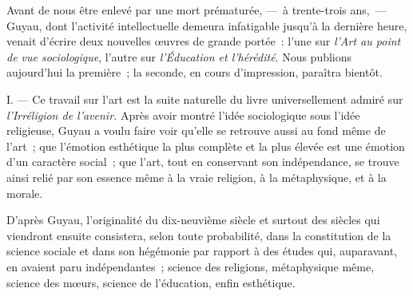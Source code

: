 \documentclass[french,twoside]{book} %
\begin{document}
\noindent Avant de nous être enlevé par une mort prématurée, — à trente-trois ans, — Guyau, dont l’activité intellectuelle demeura infatigable jusqu’à la dernière heure, venait d’écrire deux nouvelles œuvres de grande portée : l’une sur \emph{l’Art au point de vue sociologique}, l’autre sur \emph{l’Éducation et l’hérédité}. Nous publions aujourd’hui la première ; la seconde, en cours d’impression, paraîtra bientôt.\par
I. — Ce travail sur l’art est la suite naturelle du livre universellement admiré sur \emph{l’Irréligion de l’avenir.} Après avoir montré l’idée sociologique sous l’idée religieuse, Guyau a voulu faire voir qu’elle se retrouve aussi au fond même de l’art ; que l’émotion esthétique la plus complète et la plus élevée est une émotion d’un caractère social ; que l’art, tout en conservant son indépendance, se trouve ainsi relié par son essence même à la vraie religion, à la métaphysique, et à la morale.\par
D’après Guyau, l’originalité du dix-neuvième siècle et surtout des siècles qui viendront ensuite consistera, selon toute probabilité, dans la constitution de la science sociale et dans son hégémonie par rapport à des études qui, auparavant, en avaient paru indépendantes ; science des religions, métaphysique même, science des mœurs, science de l’éducation, enfin esthétique.\par
\end{document}

